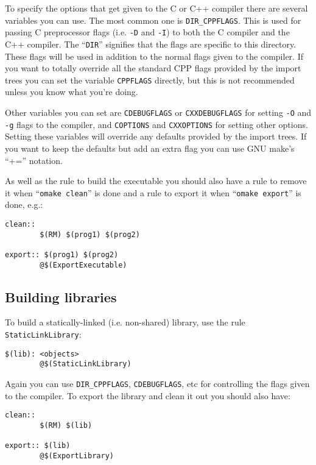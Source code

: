 \documentclass[11pt]{article}
\begin{document}
To specify the options that get given to the C or C++ compiler there are
several variables you can use.  The most common one is {\tt DIR\_CPPFLAGS}.
This is used for passing C preprocessor flags (i.e. {\tt -D} and {\tt -I}) to
both the C compiler and the C++ compiler.  The ``{\tt DIR}'' signifies that the
flags are specific to this directory.  These flags will be used in addition to
the normal flags given to the compiler.  If you want to totally override all
the standard CPP flags provided by the import trees you can set the variable
{\tt CPPFLAGS} directly, but this is not recommended unless you know what
you're doing.

Other variables you can set are {\tt CDEBUGFLAGS} or {\tt CXXDEBUGFLAGS} for
setting {\tt -O} and {\tt -g} flags to the compiler, and {\tt COPTIONS} and
{\tt CXXOPTIONS} for setting other options.  Setting these variables will
override any defaults provided by the import trees.  If you want to keep the
defaults but add an extra flag you can use GNU make's ``+='' notation.

As well as the rule to build the executable you should also have a rule to
remove it when ``{\tt omake clean}'' is done and a rule to export it when
``{\tt omake export}'' is done, e.g.:

\begin{verbatim}
clean::
        $(RM) $(prog1) $(prog2)

export:: $(prog1) $(prog2)
        @$(ExportExecutable)
\end{verbatim}

\subsection{Building libraries}

To build a statically-linked (i.e. non-shared) library, use the rule
{\tt StaticLinkLibrary}:

\begin{verbatim}
$(lib): <objects>
        @$(StaticLinkLibrary)
\end{verbatim}

Again you can use {\tt DIR\_CPPFLAGS}, {\tt CDEBUGFLAGS}, etc for controlling
the flags given to the compiler.  To export the library and clean it out you
should also have:

\begin{verbatim}
clean::
        $(RM) $(lib)

export:: $(lib)
        @$(ExportLibrary)
\end{verbatim}
\end{document}
